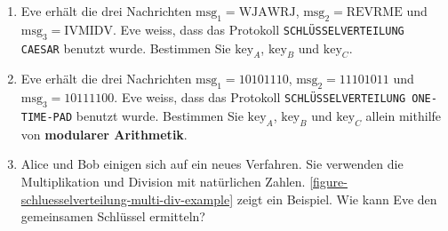 \begin{enumerate}
	\item  Eve erhält die drei Nachrichten $\text{msg}_1 = \text{WJAWRJ}$, $\text{msg}_2 = \text{REVRME}$ und $\text{msg}_3 = \text{IVMIDV}$. Eve weiss, dass das Protokoll \texttt{SCHLÜSSELVERTEILUNG CAESAR} benutzt wurde. Bestimmen Sie $\text{key}_A$, $\text{key}_B$ und $\text{key}_C$.
	
	

\newpage

\item  Eve erhält die drei Nachrichten $\text{msg}_1 = 10101110$, $\text{msg}_2 = 11101011$ und $\text{msg}_3 = 10111100$. Eve weiss, dass das Protokoll \texttt{SCHLÜSSELVERTEILUNG ONE-TIME-PAD} benutzt wurde. Bestimmen Sie $\text{key}_A$, $\text{key}_B$ und $\text{key}_C$ allein mithilfe von \textbf{modularer Arithmetik}.
	
	
	\fillwithgrid{3in}
	
	\item Alice und Bob einigen sich auf ein neues Verfahren. Sie verwenden die Multiplikation und Division mit natürlichen Zahlen. \autoref{figure-schluesselverteilung-multi-div-example} zeigt ein Beispiel. Wie kann Eve den gemeinsamen Schlüssel ermitteln?

\begin{figure}[htb]
\end{figure}
\end{enumerate}
